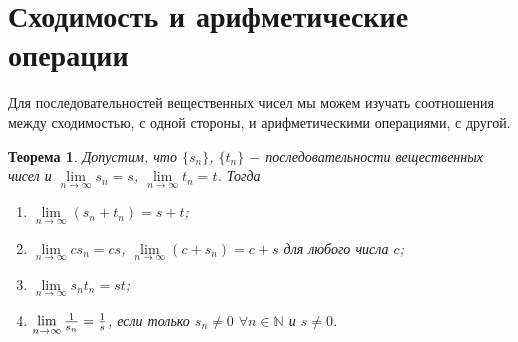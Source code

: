 \documentclass{article}
\newtheorem{theorem}{Теорема}[section]
\begin{document}
\section{Сходимость и арифметические операции}

Для последовательностей вещественных чисел мы можем изучать соотношения между сходимостью, с одной стороны, и арифметическими операциями, с другой.

\begin{theorem}
Допустим, что \(\{s_n\}\), \(\{t_n\}\) \(-\) последовательности вещественных чисел и \(\lim\limits_{n \to \infty} s_n = s\), \(\lim\limits_{n \to \infty} t_n = t\). Тогда
\begin{enumerate}
    \item \(\lim\limits_{n \to \infty} (s_n + t_n) = s + t\);
    \item \(\lim\limits_{n \to \infty} cs_n = cs\), \(\lim\limits_{n \to \infty} (c + s_n) = c + s\) для любого числа \(c\);
    \item \(\lim\limits_{n \to \infty} {s_n}{t_n} = st\);
    \item \(\lim\limits_{n \to \infty} {1 \over s_n} = {1 \over s}\), если только \(s_n \neq 0\) \(\forall n \in \mathbb{N}\) и \(s \neq 0\).
\end{enumerate}
\end{theorem}
\pagebreak
\end{document}
